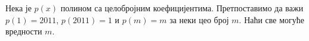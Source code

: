 \problem
Нека је $p(x)$ полином са целобројним коефицијентима.
Претпоставимо да важи $p(1) = 2011$, $p(2011) = 1$ и $p(m) = m$ за неки цео
број $m$.
Наћи све могуће вредности $m$.

\solution

\endproblem
